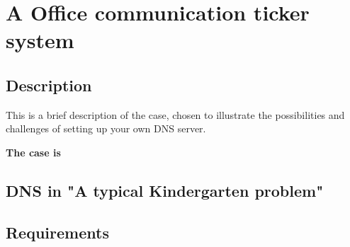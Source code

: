 \chapter{A Office communication ticker system}
\section{Description}
This is a brief description of the case, chosen to illustrate the possibilities and challenges of setting up your own DNS server.

\textbf{The case is}


\section{DNS in "A typical Kindergarten problem"}


\section{Requirements}

